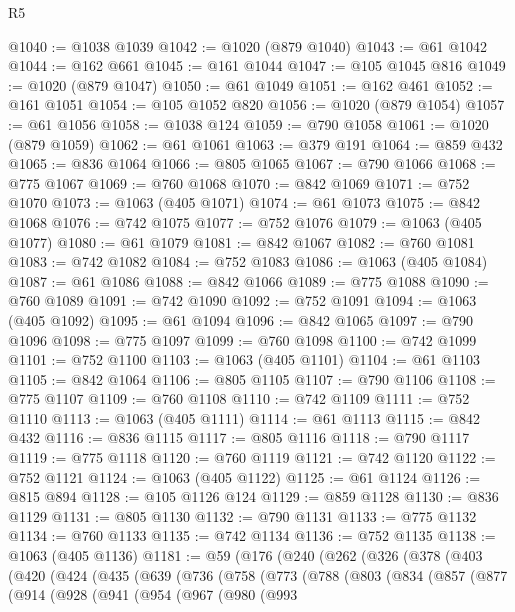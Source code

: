 \begin{lexlean}{R5}
\begin{coremodule}
{{{{{{{{{{{{{{{{{{{{{{{{{{{{{{{{{{{{{{{{{{{{{{{{{{{{{{{{{{{{{{{{{{{{{{{{{{{{{{{{{{{{@1040 := @1038 @1039
@1042 := @1020 (@879 @1040)
@1043 := @61 @1042
@1044 := @162 @661
@1045 := @161 @1044
@1047 := @105 @1045 @816
@1049 := @1020 (@879 @1047)
@1050 := @61 @1049
@1051 := @162 @461
@1052 := @161 @1051
@1054 := @105 @1052 @820
@1056 := @1020 (@879 @1054)
@1057 := @61 @1056
@1058 := @1038 @124
@1059 := @790 @1058
@1061 := @1020 (@879 @1059)
@1062 := @61 @1061
@1063 := @379 @191
@1064 := @859 @432
@1065 := @836 @1064
@1066 := @805 @1065
@1067 := @790 @1066
@1068 := @775 @1067
@1069 := @760 @1068
@1070 := @842 @1069
@1071 := @752 @1070
@1073 := @1063 (@405 @1071)
@1074 := @61 @1073
@1075 := @842 @1068
@1076 := @742 @1075
@1077 := @752 @1076
@1079 := @1063 (@405 @1077)
@1080 := @61 @1079
@1081 := @842 @1067
@1082 := @760 @1081
@1083 := @742 @1082
@1084 := @752 @1083
@1086 := @1063 (@405 @1084)
@1087 := @61 @1086
@1088 := @842 @1066
@1089 := @775 @1088
@1090 := @760 @1089
@1091 := @742 @1090
@1092 := @752 @1091
@1094 := @1063 (@405 @1092)
@1095 := @61 @1094
@1096 := @842 @1065
@1097 := @790 @1096
@1098 := @775 @1097
@1099 := @760 @1098
@1100 := @742 @1099
@1101 := @752 @1100
@1103 := @1063 (@405 @1101)
@1104 := @61 @1103
@1105 := @842 @1064
@1106 := @805 @1105
@1107 := @790 @1106
@1108 := @775 @1107
@1109 := @760 @1108
@1110 := @742 @1109
@1111 := @752 @1110
@1113 := @1063 (@405 @1111)
@1114 := @61 @1113
@1115 := @842 @432
@1116 := @836 @1115
@1117 := @805 @1116
@1118 := @790 @1117
@1119 := @775 @1118
@1120 := @760 @1119
@1121 := @742 @1120
@1122 := @752 @1121
@1124 := @1063 (@405 @1122)
@1125 := @61 @1124
@1126 := @815 @894
@1128 := @105 @1126 @124
@1129 := @859 @1128
@1130 := @836 @1129
@1131 := @805 @1130
@1132 := @790 @1131
@1133 := @775 @1132
@1134 := @760 @1133
@1135 := @742 @1134
@1136 := @752 @1135
@1138 := @1063 (@405 @1136)
@1181 := @59
    (@176
      (@240
        (@262
          (@326
            (@378
              (@403
                (@420
                  (@424
                    (@435
                      (@639
                        (@736
                          (@758
                            (@773
                              (@788
                                (@803
                                  (@834
                                    (@857
                                      (@877
                                        (@914
                                          (@928
                                            (@941
                                              (@954
                                                (@967
                                                  (@980
                                                    (@993
}}}}}}}}}}}}}}}}}}}}}}}}}}}}}}}}}}}}}}}}}}}}}}}}}}}}}}}}}}}}}}}}}}}}}}}}}}}}}}}}}}}}
\end{coremodule}
\end{lexlean}
